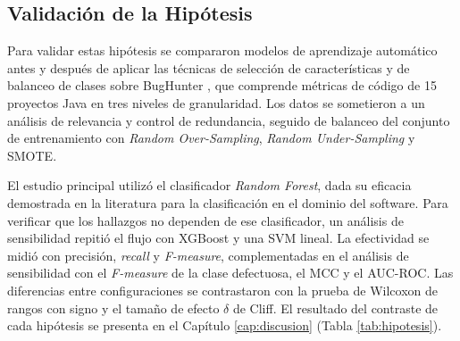 \subsection*{Validación de la Hipótesis}

Para validar estas hipótesis se compararon modelos de aprendizaje automático antes y después de aplicar las técnicas de selección de características y de balanceo de clases sobre BugHunter \cite{ferenc_automatically_2020}, que comprende métricas de código de 15 proyectos Java en tres niveles de granularidad. Los datos se sometieron a un análisis de relevancia y control de redundancia, seguido de balanceo del conjunto de entrenamiento con \textit{Random Over-Sampling}, \textit{Random Under-Sampling} y SMOTE.

El estudio principal utilizó el clasificador \textit{Random Forest}, dada su eficacia demostrada en la literatura para la clasificación en el dominio del software. Para verificar que los hallazgos no dependen de ese clasificador, un análisis de sensibilidad repitió el flujo con XGBoost y una SVM lineal. La efectividad se midió con precisión, \textit{recall} y \textit{F-measure}, complementadas en el análisis de sensibilidad con el \textit{F-measure} de la clase defectuosa, el MCC y el AUC-ROC. Las diferencias entre configuraciones se contrastaron con la prueba de Wilcoxon de rangos con signo y el tamaño de efecto $\delta$ de Cliff. El resultado del contraste de cada hipótesis se presenta en el Capítulo \ref{cap:discusion} (Tabla \ref{tab:hipotesis}).
